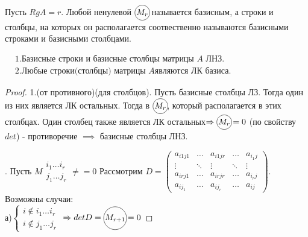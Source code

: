 \documentclass[../main.tex]{subfiles}
\begin{document}
\begin{definition}
    Пусть $RgA=r.$ Любой ненулевой $\tcircle{$M_{r}$}$ называется базисным, а строки и столбцы, на которых он располагается соотвественно называются базисными строками и базисными столбцами.
\end{definition}
\vspace{1cm}
\begin{theorem} 
   \quad 
   $ \begin{aligned}&1. \text{Базисные строки и базисные столбцы матрицы } A \text{ ЛНЗ}. \\ 
        &2. \text{Любые строки(столбцы) матрицы } A \text{являются ЛК базиса}.
    \end{aligned}$
\end{theorem}

\begin{proof}
    1.(от противного)(для столбцов). Пусть базисные столбцы ЛЗ. Тогда один из них является ЛК остальных. Тогда в $\tcircle{$M_{r}$}$, который располагается в этих столбцах. Один столбец также является ЛК остальных$\implies \tcircle{$M_{r}$}=0$ (по свойству $det$) - противоречие $\implies$ базисные столбцы ЛНЗ. 

    . Пусть $M\begin{matrix}
        i_{1}\dots i_{r}\\ 
        j_{1}\dots j_{r}
    \end{matrix}\neq =0$ Рассмотрим $D=\begin{pmatrix}
        a_{i1j1} &\dots& a_{i1jr} & \dots&a_{i_{1}j} \\ 
        \vdots &\ddots&\vdots &\ddots&\vdots\\
        a_{irj1} &\dots& a_{irjr} & \dots&a_{i_{r}j}\\ 
        a_{ij_{1}} &\dots& a_{ij_{r}} & \dots&a_{ij}
    \end{pmatrix}$. Возможны случаи: \\ 
    а)$\begin{cases}
    {i\notin{i_{1}\dots i_{r}}}\\
    i\notin{j_{1}\dots j_{r}}
    \end{cases}$ $\implies detD=\tcircle{$M_{r+1}$}=0$
    

\end{proof}
\end{document}

